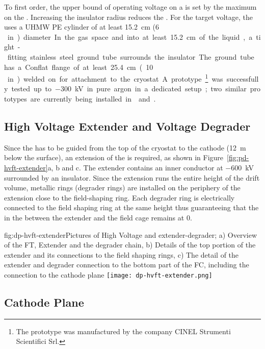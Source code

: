 To first order, the upper bound of operating voltage on a \fdth is set by the maximum \efield on the \fdth.  Increasing the insulator radius reduces the \efield.  For the target voltage, the \fdth uses a UHMW PE cylinder of at least \SI{15.2}{\cm} (\SI{6}\,in) diameter.  In the gas space and into at least \SI{15.2}{\cm} of the liquid, a tight-fitting stainless steel ground tube surrounds the insulator.  The ground tube has a Conflat flange of at least \SI{25.4}{\cm} (\SI{10}\,in) welded on for attachment to the cryostat.  A prototype\footnote{The prototype was manufactured by the company CINEL\texttrademark{} Strumenti Scientifici Srl.}  was successfully tested up to \SI{-300}{\kV} in pure argon in a dedicated setup; two similar prototypes are currently being installed in  and .


\subsection{High Voltage Extender and Voltage Degrader}

Since the \hv has to be guided from the top of the cryostat to the cathode (\SI{12}{\m} below the  surface), an extension of the \hv \fdth is required, as shown in Figure~\ref{fig:pd-hvft-extender}a, b and c. The extender contains an inner conductor at \SI{-600}{\kV} surrounded by an insulator. Since the extension runs the entire height of the drift volume, metallic rings (degrader rings) are installed on the periphery of the extension close to the field-shaping ring. Each degrader ring is electrically connected to the field shaping ring at the same height thus guaranteeing that the \efield in the \lar between the extender and the field cage remains at 0.


\begin{dunefigure}{fig:dp-hvft-extender}{Pictures of High Voltage \fdth and  extender-degrader; a) Overview of the  FT,  Extender and the degrader chain, b) Details of the top portion of the  extender and its connections to the field shaping rings, c) The detail of the  extender and degrader connection to the bottom part of the FC, including the connection to the cathode plane}
\texttt{[image: dp-hvft-extender.png]}
\end{dunefigure}

\subsection{Cathode Plane}


